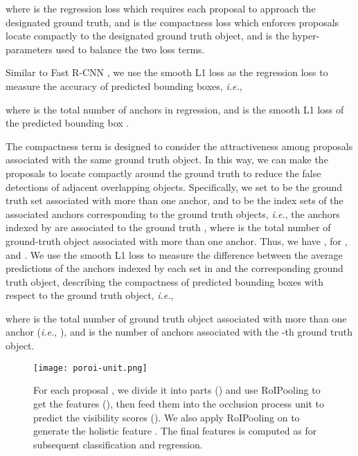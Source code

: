 \documentclass[runningheads]{llncs}
\def\ie{{\em i.e.}}
\begin{document}
where  is the regression loss which requires each proposal to approach the designated ground truth, and  is the compactness loss which enforces proposals locate compactly to the designated ground truth object, and  is the hyper-parameters used to balance the two loss terms.

Similar to Fast R-CNN \cite{DBLP:conf/iccv/Girshick15}, we use the smooth L1 loss as the regression loss  to measure the accuracy of predicted bounding boxes, \ie,

where  is the total number of anchors in regression, and  is the smooth L1 loss of the predicted bounding box .

The compactness term  is designed to consider the attractiveness among proposals associated with the same ground truth object. In this way, we can make the proposals to locate compactly around the ground truth to reduce the false detections of adjacent overlapping objects. Specifically, we set  to be the ground truth set associated with more than one anchor, and  to be the index sets of the associated anchors corresponding to the ground truth objects, \ie, the anchors indexed by  are associated to the ground truth , where  is the total number of ground-truth object associated with more than one anchor. Thus, we have , for , and . We use the smooth L1 loss to measure the difference between the average predictions of the anchors indexed by each set in  and the corresponding ground truth object, describing the compactness of predicted bounding boxes with respect to the ground truth object, \ie,

where  is the total number of ground truth object associated with more than one anchor (\ie, ), and  is the number of anchors associated with the -th ground truth object.


\begin{figure*}[t]
\centering
\texttt{[image: poroi-unit.png]}
\caption{For each proposal , we divide it into  parts () and use RoIPooling to get the features (), then feed them into the occlusion process unit to predict the visibility scores (). We also apply RoIPooling on  to generate the holistic feature . The final features is computed as  for subsequent classification and regression.}
\label{fig:poroi-unit}
\end{figure*}
\end{document}
